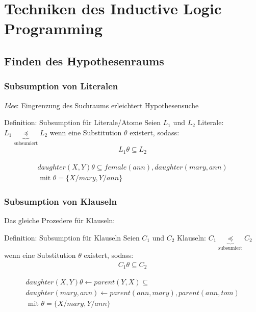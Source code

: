 \section{Techniken des Inductive Logic Programming}
\subsection{Finden des Hypothesenraums}
\begin{frame}
	\frametitle{Subsumption von Literalen}
	\emph{Idee}: Eingrenzung des Suchraums erleichtert Hypothesensuche

	\begin{block}{Definition: Subsumption für Literale/Atome}
		Seien $L_1$ und $L_2$ Literale: $L_1 \underbrace{\preceq}_{\text{subsumiert}} L_2$
		wenn eine Substitution $\theta$ existert, sodass:
		\begin{align*}
			 L_1 \theta \subseteq L_2
		\end{align*}
	\end{block}
	\begin{bsp}
		\begin{align*}
			 daughter(X, Y)\theta\subseteq female(ann), daughter(mary, ann)\\\text{  mit  } \theta = \{X/mary, Y/ann\}
		\end{align*}
	\end{bsp}
\end{frame}
\begin{frame}
	\frametitle{Subsumption von Klauseln}
	Das gleiche Prozedere für Klauseln:
	\begin{block}{Definition: Subsumption für Klauseln}
		Seien $C_1$ und $C_2$ Klauseln: $C_1 \underbrace{\preceq}_{\text{subsumiert}} C_2$
		wenn eine Substitution $\theta$ existert, sodass:
		\begin{align*}
			 C_1 \theta \subseteq C_2
		\end{align*}
	\end{block}
	\begin{bsp}
		\begin{gather*}
			 daughter(X, Y)\theta\leftarrow parent(Y,X) \subseteq\\
			 daughter(mary, ann) \leftarrow parent(ann, mary), parent(ann, tom)\\
			 \text{  mit  } \theta = \{X/mary, Y/ann\}
		\end{gather*}
	\end{bsp}
\end{frame}

